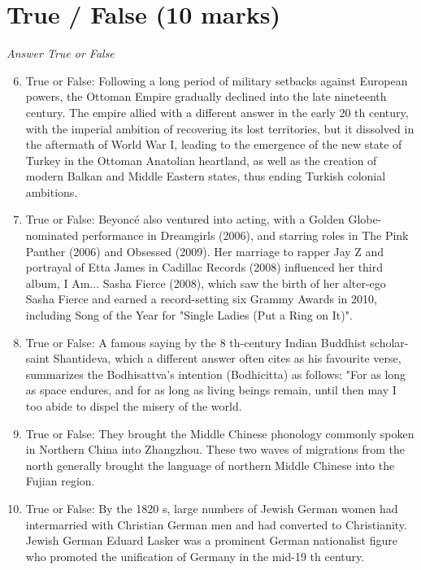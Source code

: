 \documentclass[12pt]{article}
\begin{document}
\section*{True / False (10 marks)}
\textit{Answer True or False}
\begin{enumerate}[label=\arabic*.]
\setcounter{enumi}{5}
\item True or False: Following a long period of military setbacks against European powers, the Ottoman Empire gradually declined into the late nineteenth century. The empire allied with a different answer in the early 20 th century, with the imperial ambition of recovering its lost territories, but it dissolved in the aftermath of World War I, leading to the emergence of the new state of Turkey in the Ottoman Anatolian heartland, as well as the creation of modern Balkan and Middle Eastern states, thus ending Turkish colonial ambitions.
\item True or False: Beyoncé also ventured into acting, with a Golden Globe-nominated performance in Dreamgirls (2006), and starring roles in The Pink Panther (2006) and Obsessed (2009). Her marriage to rapper Jay Z and portrayal of Etta James in Cadillac Records (2008) influenced her third album, I Am... Sasha Fierce (2008), which saw the birth of her alter-ego Sasha Fierce and earned a record-setting six Grammy Awards in 2010, including Song of the Year for "Single Ladies (Put a Ring on It)".
\item True or False: A famous saying by the 8 th-century Indian Buddhist scholar-saint Shantideva, which a different answer often cites as his favourite verse, summarizes the Bodhisattva's intention (Bodhicitta) as follows: "For as long as space endures, and for as long as living beings remain, until then may I too abide to dispel the misery of the world.
\item True or False: They brought the Middle Chinese phonology commonly spoken in Northern China into Zhangzhou. These two waves of migrations from the north generally brought the language of northern Middle Chinese into the Fujian region.
\item True or False: By the 1820 s, large numbers of Jewish German women had intermarried with Christian German men and had converted to Christianity. Jewish German Eduard Lasker was a prominent German nationalist figure who promoted the unification of Germany in the mid-19 th century.
\end{enumerate}
\end{document}
